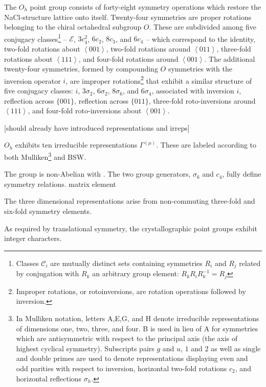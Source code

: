 \documentclass[twocolumn,showpacs,preprintnumbers,superscriptaddress,prb,floatfix,aps,10pt]{revtex4-1}
\newcommand*{\class}{\mathcal{C}}
\newcommand*{\id}{\mathcal{E}}
\begin{document}
The $O_h$ point group consists of forty-eight symmetry operations which restore the NaCl-structure lattice onto itself. Twenty-four symmetries are proper rotations belonging to the chiral octahedral subgroup $O$. These are subdivided among five conjugacy classes\footnote{Classes $\class_i$ are mutually distinct sets containing symmetries $R_i$ and $R_j$ related by conjugation with $R_k$ an arbitrary group element: $R_kR_iR_k^{-1}=R_j$} --  $\id$, $3c_4^2$, $6c_2$, $8c_3$, and $6c_4$ -- which correspond to the identity, two-fold rotations about $\left<001\right>$, two-fold rotations around $\left<011\right>$, three-fold rotations about $\left<111\right>$, and four-fold rotations around $\left<001\right>$. The additional twenty-four symmetries, formed by compounding $O$ symmetries with the inversion operator $i$, are improper rotations\footnote{Improper rotations, or rotoinversions, are rotation operations followed by inversion.} that exhibit a similar structure of five conjugacy classes: $i$, $3\sigma_2$, $6\sigma_2$, $8\sigma_6$, and $6\sigma_4$, associated with inversion $i$, reflection across $\{001\}$, reflection across $\{011\}$, three-fold roto-inversions around $\left<111\right>$, and four-fold roto-inversions about $\left<001\right>$. 

[should already have introduced representations and irreps]

$O_h$ exhibits ten irreducible representations $\Gamma^{(\mu)}$. These are labeled according to both Mulliken\footnote{In Mulliken notation, letters A,E,G, and H denote irreducible representations of dimensions one, two, three, and four. B is used in lieu of A for symmetries which are antisymmetric with respect to the principal axis (the axis of highest cyclical symmetry). Subscripts pairs $g$ and $u$, $1$ and $2$ as well as single and double primes are used to denote representations displaying even and odd parities with respect to inversion, horizontal two-fold rotations $c_2$, and horizontal reflections $\sigma_h$.} and BSW.


The group is non-Abelian with . The two group generators, $\sigma_6$ and $c_4$, fully define symmetry relations.
matrix element 


The three dimensional representations arise from non-commuting three-fold and six-fold symmetry elements. 




As required by translational symmetry, the crystallographic point groups exhibit integer characters.
\end{document}
